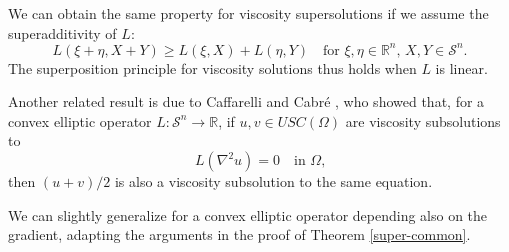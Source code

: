 \documentclass[12pt, reqno]{amsart}
\newtheorem{remark}{Remark}%
\newcommand{\R}{\mathbb{R}}
\def\R{{\mathbb R}}
\def\S{{\mathcal S}}
\begin{document}
We can obtain the same property for viscosity supersolutions if we assume the superadditivity of $L$: 
\[
L(\xi+\eta, X+Y)\geq L(\xi, X)+L(\eta, Y) \quad \text{for $\xi, \eta\in \R^n$, $X, Y\in \S^n$.}
\]
The superposition principle for viscosity solutions thus holds when $L$ is linear. 

 

Another related result is due to Caffarelli and Cabr\'e \cite[Theorem 5.8]{CaCr}, who showed that, for a convex elliptic operator $L:\S^n\to \R$,  if $u,v\in USC(\Omega)$ are viscosity subsolutions to 
\[
L(\nabla^2 u)=0\quad \text{in $\Omega$,}
\] 
then $(u+v)/2$ is also a viscosity subsolution to the same equation. 

We can slightly generalize \cite[Theorem 5.8]{CaCr} for a convex elliptic operator depending also on the gradient, adapting the arguments in the proof of Theorem \ref{super-common}. 
\end{document}
